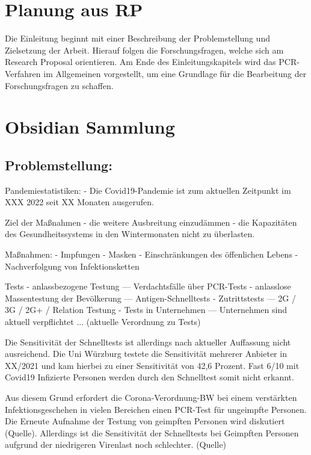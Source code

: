 
\section{Planung aus RP}
Die Einleitung beginnt mit einer Beschreibung der Problemstellung und Zielsetzung der Arbeit.
Hierauf folgen die Forschungsfragen, welche sich am Research Proposal orientieren.
Am Ende des Einleitungskapitels wird das PCR-Verfahren im Allgemeinen vorgestellt, um eine Grundlage für die Bearbeitung der Forschungsfragen zu schaffen.

\section{Obsidian Sammlung}
\subsection{Problemstellung:}
Pandemiestatistiken:
- Die Covid19-Pandemie ist zum aktuellen Zeitpunkt im XXX 2022 seit XX Monaten ausgerufen.

Ziel der Maßnahmen
- die weitere Ausbreitung einzudämmen
- die Kapazitäten des Gesundheitssystems in den Wintermonaten nicht zu überlasten.

Maßnahmen:
- Impfungen
- Masken
- Einschränkungen des öffenlichen Lebens
- Nachverfolgung von Infektionsketten

Tests
- anlassbezogene Testung
--- Verdachtsfälle über PCR-Tests
- anlasslose Massentestung der Bevölkerung
--- Antigen-Schnelltests
- Zutrittstests
--- 2G / 3G / 2G+ / Relation Testung
- Tests in Unternehmen
--- Unternehmen sind aktuell verpflichtet ... (aktuelle Verordnung zu Tests)

Die Sensitivität der Schnelltests ist allerdings nach aktueller Auffassung nicht ausreichend. Die Uni Würzburg testete die Sensitivität mehrerer Anbieter in XX/2021 und kam hierbei zu einer Sensitivität von 42,6 Prozent. Fast 6/10 mit Covid19 Infizierte Personen werden durch den Schnelltest somit nicht erkannt.

Aus diesem Grund erfordert die Corona-Verordnung-BW bei einem verstärkten Infektionsgeschehen in vielen Bereichen einen PCR-Test für ungeimpfte Personen. Die Erneute Aufnahme der Testung von geimpften Personen wird diskutiert (Quelle). Allerdings ist die Sensitivität der Schnelltests bei Geimpften Personen aufgrund der niedrigeren Virenlast noch schlechter. (Quelle)

